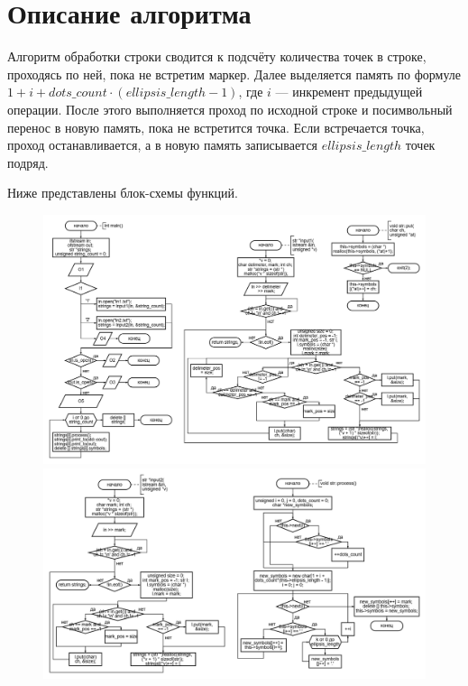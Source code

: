 \documentclass[12pt,a4paper]{extarticle}
\begin{document}
\section{Описание алгоритма}
Алгоритм обработки строки сводится к подсчёту количества точек в строке, проходясь по ней, пока не встретим
маркер. Далее выделяется память по формуле $1 + i + dots\_count\cdot(ellipsis\_length - 1)$, где $i$ --- инкремент
предыдущей операции. После этого выполняется проход по исходной строке и посимвольный перенос в новую память, пока
не встретится точка. Если встречается точка, проход останавливается, а в новую память записывается $ellipsis\_length$
точек подряд.

Ниже представлены блок-схемы функций.
\begin{figure}[h]
    \centering
    \includegraphics[width=0.9\linewidth]{figures/lab1/Frame 3.png}
    \includegraphics[width=0.9\linewidth]{figures/lab1/Frame 4.png}
\end{figure}
\end{document}
